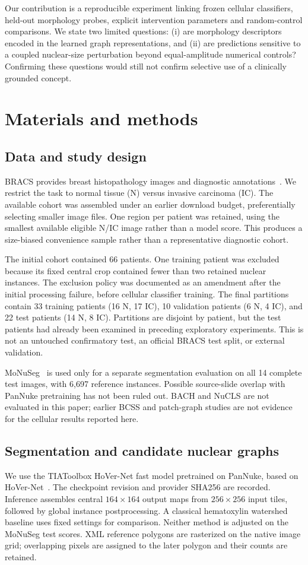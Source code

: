 \documentclass[11pt,a4paper]{article}
\begin{document}
Our contribution is a reproducible experiment linking frozen cellular classifiers, held-out morphology probes, explicit intervention parameters and random-control comparisons. We state two limited questions: (i) are morphology descriptors encoded in the learned graph representations, and (ii) are predictions sensitive to a coupled nuclear-size perturbation beyond equal-amplitude numerical controls? Confirming these questions would still not confirm selective use of a clinically grounded concept.

\section{Materials and methods}
\subsection{Data and study design}
BRACS provides breast histopathology images and diagnostic annotations~\cite{brancati2022}. We restrict the task to normal tissue (N) versus invasive carcinoma (IC). The available cohort was assembled under an earlier download budget, preferentially selecting smaller image files. One region per patient was retained, using the smallest available eligible N/IC image rather than a model score. This produces a size-biased convenience sample rather than a representative diagnostic cohort.

The initial cohort contained 66 patients. One training patient was excluded because its fixed central crop contained fewer than two retained nuclear instances. The exclusion policy was documented as an amendment after the initial processing failure, before cellular classifier training. The final partitions contain 33 training patients (16 N, 17 IC), 10 validation patients (6 N, 4 IC), and 22 test patients (14 N, 8 IC). Partitions are disjoint by patient, but the test patients had already been examined in preceding exploratory experiments. This is not an untouched confirmatory test, an official BRACS test split, or external validation.

MoNuSeg~\cite{monuseg} is used only for a separate segmentation evaluation on all 14 complete test images, with 6,697 reference instances. Possible source-slide overlap with PanNuke pretraining has not been ruled out. BACH and NuCLS are not evaluated in this paper; earlier BCSS and patch-graph studies are not evidence for the cellular results reported here.

\subsection{Segmentation and candidate nuclear graphs}
We use the TIAToolbox HoVer-Net fast model pretrained on PanNuke, based on HoVer-Net~\cite{graham2019}. The checkpoint revision and provider SHA256 are recorded. Inference assembles central $164\times164$ output maps from $256\times256$ input tiles, followed by global instance postprocessing. A classical hematoxylin watershed baseline uses fixed settings for comparison. Neither method is adjusted on the MoNuSeg test scores. XML reference polygons are rasterized on the native image grid; overlapping pixels are assigned to the later polygon and their counts are retained.
\end{document}
